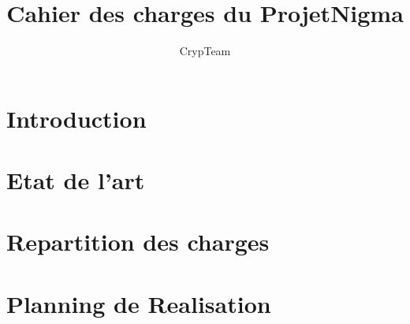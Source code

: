 \documentclass[a4paper,12pt]{article}
\title{Cahier des charges du ProjetNigma}
\author{CrypTeam}
\date{}
\begin{document}
	\maketitle{}
  	\tableofcontents
	\newpage				
	\section{Introduction}
	\newpage
	\section{Etat de l'art}
	\newpage
	\section{Repartition des charges}
	\section{Planning de Realisation} %
\end{document}
